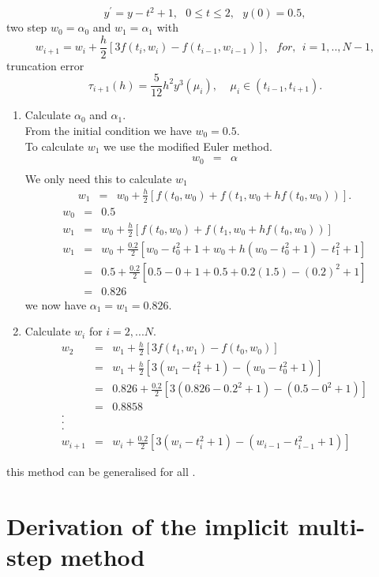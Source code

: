 \begin{example}
\[ y^{'}=y-t^2+1, \ \ \ 0 \leq t \leq 2, \ \ \ y(0)=0.5, \]
 two step
$w_0=\alpha_0$ and $w_1=\alpha_1$ with
\[w_{i+1}=w_i+\frac{h}{2}[3f(t_i,w_{i})-f(t_{i-1},w_{i-1})], \ \ \ for, \ \ i=1,..,N-1, \]
truncation error \[ \tau_{i+1}(h)=\frac{5}{12}h^2 y^3(\mu_i), \ \ \ \ \ \mu_i \in (t_{i-1},t_{i+1}).\]
\begin{enumerate}
\item Calculate $\alpha_0$ and $\alpha_1$.\\
From the initial condition we have $w_0=0.5.$\\
To calculate $w_1$ we use the modified Euler method.
\begin{eqnarray*}
w_0&=&\alpha\\
\end{eqnarray*}
We only need this to calculate $w_1$
\begin{eqnarray*}
w_{1} &=& w_0 +\frac{h}{2}[f(t_0,w_0)+f(t_{1},w_0+hf(t_0,w_0))]. 
\end{eqnarray*}
\begin{eqnarray*}
w_0&=&0.5\\
w_{1} &=& w_0 +\frac{h}{2}[f(t_0,w_0)+f(t_{1},w_0+hf(t_0,w_0))] \\
w_{1} &=& w_0 +\frac{0.2}{2}[w_0-t^2_0+1+w_0+h(w_0-t^2_0+1)-t_1^2+1] \\
 &=& 0.5 +\frac{0.2}{2}[0.5-0+1+0.5+0.2(1.5)-(0.2)^2+1] \\
 &=& 0.826
\end{eqnarray*}
we now have $\alpha_1=w_1=0.826.$
\item Calculate $w_i$ for $i=2,...N.$
\begin{eqnarray*}
w_{2}&=&w_1+\frac{h}{2}[3f(t_1,w_{1})-f(t_0,w_{0})] \\
&=&w_1+\frac{h}{2}[3(w_{1}-t_1^2+1)-(w_{0}-t_0^2+1)] \\
&=&0.826+\frac{0.2}{2}[3(0.826-0.2^2+1)-(0.5-0^2+1)] \\
&=&0.8858 \\
.\\
.\\
.\\
w_{i+1}&=&w_i+\frac{0.2}{2}[3(w_{i}-t_i^2+1)-(w_{i-1}-t_{i-1}^2+1)] 
\end{eqnarray*}
\end{enumerate}
this method can be generalised for all .
\end{example}

\section{Derivation of the implicit multi-step method}


